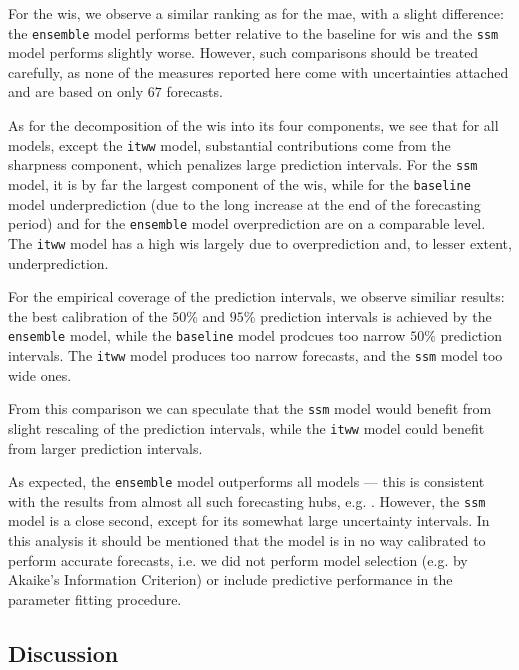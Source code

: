 For the \acrshort{wis}, we observe a similar ranking as for the \acrshort{mae}, with a slight difference: the \texttt{ensemble} model performs better relative to the baseline for \acrshort{wis} and the \texttt{ssm} model performs slightly worse. However, such comparisons should be treated carefully, as none of the measures reported here come with uncertainties attached and are based on only $67$ forecasts. 

As for the decomposition of the \acrshort{wis} into its four components, we see that for all models, except the \texttt{itww} model, substantial contributions come from the sharpness component, which penalizes large prediction intervals. For the \texttt{ssm} model, it is by far the largest component of the \acrshort{wis}, while for the \texttt{baseline} model underprediction (due to the long increase at the end of the forecasting period) and for the \texttt{ensemble} model overprediction are on a comparable level. 
The \texttt{itww} model has a high \acrshort{wis} largely due to overprediction and, to lesser extent, underprediction. 

For the empirical coverage of the prediction intervals, we observe similiar results: the best calibration of the $50\%$ and $95\%$ prediction intervals is achieved by the \texttt{ensemble} model, while the \texttt{baseline} model prodcues too narrow $50\%$ prediction intervals. The \texttt{itww} model produces too narrow forecasts, and the \texttt{ssm} model too wide ones. 

From this comparison we can speculate that the \texttt{ssm} model would benefit from slight rescaling of the prediction intervals, while the \texttt{itww} model could benefit from larger prediction intervals. 

As expected, the \texttt{ensemble} model outperforms all models --- this is consistent with the results from almost all such forecasting hubs, e.g. \citep{Bracher2021Comparison,Bracher2021Preregistered,Bracher2022National,Wolffram2023Collaborative,Sherratt2022Predictive,Ray2020Ensemble}. However, the \texttt{ssm} model is a close second, except for its somewhat large uncertainty intervals. In this analysis it should be mentioned that the model is in no way calibrated to perform accurate forecasts, i.e. we did not perform model selection (e.g. by Akaike's Information Criterion) or include predictive performance in the parameter fitting procedure.

\subsection{Discussion}

